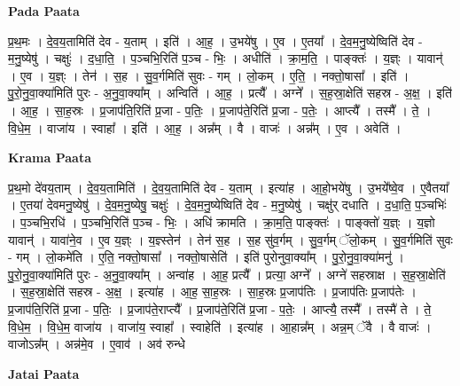 \documentclass[17pt]{extarticle}
\begin{document}
\textbf{Pada Paata} \newline

प्र॒थ॒मः । दे॒व॒य॒तामिति॑ देव - य॒ताम् । इति॑ । आ॒ह॒ । उ॒भये॑षु । ए॒व । ए॒तया᳚ । दे॒व॒म॒नु॒ष्येष्विति॑ देव - म॒नु॒ष्येषु॑ । चक्षुः॑ । द॒धा॒ति॒ । प॒ञ्चभि॒रिति॑ प॒ञ्च - भिः॒ । अधीति॑ । क्रा॒म॒ति॒ । पाङ्क्तः॑ । य॒ज्ञ्ः । यावान्॑ । ए॒व । य॒ज्ञ्ः । तेन॑ । स॒ह । सु॒व॒र्गमिति॑ सुवः - गम् । लो॒कम् । ए॒ति॒ । नक्तो॒षासा᳚ । इति॑ । पु॒रो॒नु॒वा॒क्या॑मिति॑ पुरः - अ॒नु॒वा॒क्या᳚म् । अन्विति॑ । आ॒ह॒ । प्रत्यै᳚ । अग्ने᳚ । स॒ह॒स्रा॒क्षेति॑ सहस्र - अ॒क्ष॒ । इति॑ । आ॒ह॒ । सा॒ह॒स्रः । प्र॒जाप॑ति॒रिति॑ प्र॒जा - प॒तिः॒ । प्र॒जाप॑ते॒रिति॑ प्र॒जा - प॒तेः॒ । आप्त्यै᳚ । तस्मै᳚ । ते॒ । वि॒धे॒म॒ । वाजा॑य । स्वाहा᳚ । इति॑ । आ॒ह॒ । अन्न᳚म् । वै । वाजः॑ । अन्न᳚म् । ए॒व । अवेति॑ ।  \newline


\textbf{Krama Paata} \newline

प्र॒थ॒मो दे॑वय॒ताम् । दे॒व॒य॒तामिति॑ । दे॒व॒य॒तामिति॑ देव - य॒ताम् । इत्या॑ह । आ॒हो॒भये॑षु । उ॒भये᳚ष्वे॒व । ए॒वैतया᳚ । ए॒तया॑ देवमनु॒ष्येषु॑ । दे॒व॒म॒नु॒ष्येषु॒ चक्षुः॑ । दे॒व॒म॒नु॒ष्येष्विति॑ देव - म॒नु॒ष्येषु॑ । चक्षु॑र् दधाति । द॒धा॒ति॒ प॒ञ्चभिः॑ । प॒ञ्चभि॒रधि॑ । प॒ञ्चभि॒रिति॑ प॒ञ्च - भिः॒ । अधि॑ क्रामति । क्रा॒म॒ति॒ पाङ्क्तः॑ । पाङ्क्तो॑ य॒ज्ञ्ः । य॒ज्ञो यावान्॑ । यावा॑ने॒व । ए॒व य॒ज्ञ्ः । य॒ज्ञ्स्तेन॑ । तेन॑ स॒ह । स॒ह सु॑व॒र्गम् । सु॒व॒र्गम् ॅलो॒कम् । सु॒व॒र्गमिति॑ सुवः - गम् । लो॒कमे॑ति । ए॒ति॒ नक्तो॒षासा᳚ । नक्तो॒षासेति॑ । इति॑ पुरोनुवा॒क्या᳚म् । पु॒रो॒नु॒वा॒क्या॑मनु॑ । पु॒रो॒नु॒वा॒क्या॑मिति॑ पुरः - अ॒नु॒वा॒क्या᳚म् । अन्वा॑ह । आ॒ह॒ प्रत्यै᳚ । प्रत्या॒ अग्ने᳚ । अग्ने॑ सहस्राक्ष । स॒ह॒स्रा॒क्षेति॑ । स॒ह॒स्रा॒क्षेति॑ सहस्र - अ॒क्ष॒ । इत्या॑ह । आ॒ह॒ सा॒ह॒स्रः । सा॒ह॒स्रः प्र॒जाप॑तिः । प्र॒जाप॑तिः प्र॒जाप॑तेः । प्र॒जाप॑ति॒रिति॑ प्र॒जा - प॒तिः॒ । प्र॒जाप॑ते॒राप्त्यै᳚ । प्र॒जाप॑ते॒रिति॑ प्र॒जा - प॒तेः॒ । आप्त्यै॒ तस्मै᳚ । तस्मै॑ ते । ते॒ वि॒धे॒म॒ । वि॒धे॒म॒ वाजा॑य । वाजा॑य॒ स्वाहा᳚ । स्वाहेति॑ । इत्या॑ह । आ॒हान्न᳚म् । अन्न॒म् ॅवै । वै वाजः॑ । वाजोऽन्न᳚म् । अन्न॑मे॒व । ए॒वाव॑ । अव॑ रुन्धे \newline

\textbf{Jatai Paata} \newline
\end{document}
